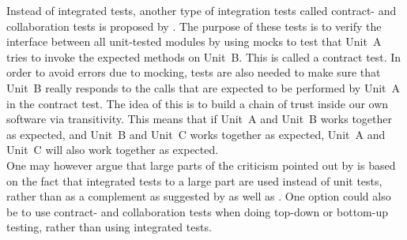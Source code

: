 Instead of integrated tests, another type of integration tests called
contract- and collaboration tests is proposed by
\citeauthor{video:integrated_scam}. The purpose of these tests is to
verify the interface between all unit-tested modules by using mocks to
test that Unit~A tries to invoke the expected methods on Unit~B. This is
called a contract test. In order to avoid errors due to mocking, tests
are also needed to make sure that Unit~B really responds to the calls
that are expected to be performed by Unit~A in the contract test. The
idea of this is to build a chain of trust inside our own software via
transitivity. This means that if Unit~A and Unit~B works together as
expected, and Unit~B and Unit~C works together as expected, Unit~A
and Unit~C will also work together as expected.\\

One may however argue that large parts of the criticism pointed out by
\citeauthor{video:integrated_scam} is based on the fact that integrated
tests to a large part are used instead of unit tests, rather than as a
complement as suggested by \citeauthor{book:pfleeger} as well as
\citeauthor{book:adp}. One option could also be to use contract- and
collaboration tests when doing top-down or bottom-up testing, rather
than using integrated tests.\\
